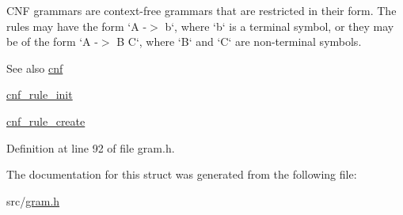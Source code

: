 \-C\-N\-F grammars are context-\/free grammars that are restricted in their form. \-The rules may have the form `\-A -\/$>$ b`, where `b` is a terminal symbol, or they may be of the form `\-A -\/$>$ \-B \-C`, where `\-B` and `\-C` are non-\/terminal symbols.

\begin{DoxySeeAlso}{\-See also}
\hyperlink{structcnf}{cnf} 

\hyperlink{gram_8h_a8273268c6def6207571b2e197ad77825}{cnf\-\_\-rule\-\_\-init} 

\hyperlink{gram_8h_af35cacdaab51e6aa556d85147def56f4}{cnf\-\_\-rule\-\_\-create} 
\end{DoxySeeAlso}


\-Definition at line 92 of file gram.\-h.



\-The documentation for this struct was generated from the following file\-:\begin{DoxyCompactItemize}
\item 
src/\hyperlink{gram_8h}{gram.\-h}\end{DoxyCompactItemize}
